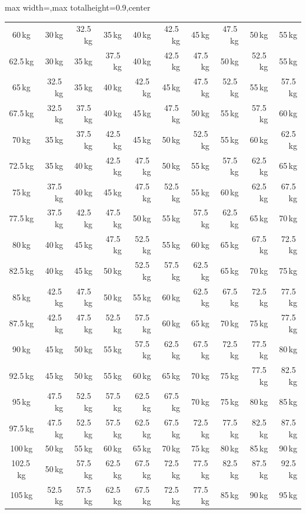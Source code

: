 \documentclass[11pt,a4paper]{article}
\begin{document}
\begin{center}
\begin{adjustbox}{max width=\linewidth,max totalheight=0.9\textheight,center}
\begin{tabular}{crrrrrrrrr}
60\,kg    & 30\,kg & 32.5\,kg & 35\,kg & 40\,kg & 42.5\,kg & 45\,kg & 47.5\,kg & 50\,kg & 55\,kg \\
62.5\,kg  & 30\,kg & 35\,kg & 37.5\,kg & 40\,kg & 42.5\,kg & 47.5\,kg & 50\,kg & 52.5\,kg & 55\,kg \\
65\,kg    & 32.5\,kg & 35\,kg & 40\,kg & 42.5\,kg & 45\,kg & 47.5\,kg & 52.5\,kg & 55\,kg & 57.5\,kg \\
67.5\,kg  & 32.5\,kg & 37.5\,kg & 40\,kg & 45\,kg & 47.5\,kg & 50\,kg & 55\,kg & 57.5\,kg & 60\,kg \\
70\,kg    & 35\,kg & 37.5\,kg & 42.5\,kg & 45\,kg & 50\,kg & 52.5\,kg & 55\,kg & 60\,kg & 62.5\,kg \\
72.5\,kg  & 35\,kg & 40\,kg & 42.5\,kg & 47.5\,kg & 50\,kg & 55\,kg & 57.5\,kg & 62.5\,kg & 65\,kg \\
75\,kg    & 37.5\,kg & 40\,kg & 45\,kg & 47.5\,kg & 52.5\,kg & 55\,kg & 60\,kg & 62.5\,kg & 67.5\,kg \\
77.5\,kg  & 37.5\,kg & 42.5\,kg & 47.5\,kg & 50\,kg & 55\,kg & 57.5\,kg & 62.5\,kg & 65\,kg & 70\,kg \\
80\,kg    & 40\,kg & 45\,kg & 47.5\,kg & 52.5\,kg & 55\,kg & 60\,kg & 65\,kg & 67.5\,kg & 72.5\,kg \\
82.5\,kg  & 40\,kg & 45\,kg & 50\,kg & 52.5\,kg & 57.5\,kg & 62.5\,kg & 65\,kg & 70\,kg & 75\,kg \\
85\,kg    & 42.5\,kg & 47.5\,kg & 50\,kg & 55\,kg & 60\,kg & 62.5\,kg & 67.5\,kg & 72.5\,kg & 77.5\,kg \\
87.5\,kg  & 42.5\,kg & 47.5\,kg & 52.5\,kg & 57.5\,kg & 60\,kg & 65\,kg & 70\,kg & 75\,kg & 77.5\,kg \\
90\,kg    & 45\,kg & 50\,kg & 55\,kg & 57.5\,kg & 62.5\,kg & 67.5\,kg & 72.5\,kg & 77.5\,kg & 80\,kg \\
92.5\,kg  & 45\,kg & 50\,kg & 55\,kg & 60\,kg & 65\,kg & 70\,kg & 75\,kg & 77.5\,kg & 82.5\,kg \\
95\,kg    & 47.5\,kg & 52.5\,kg & 57.5\,kg & 62.5\,kg & 67.5\,kg & 70\,kg & 75\,kg & 80\,kg & 85\,kg \\
97.5\,kg  & 47.5\,kg & 52.5\,kg & 57.5\,kg & 62.5\,kg & 67.5\,kg & 72.5\,kg & 77.5\,kg & 82.5\,kg & 87.5\,kg \\
100\,kg   & 50\,kg & 55\,kg & 60\,kg & 65\,kg & 70\,kg & 75\,kg & 80\,kg & 85\,kg & 90\,kg \\
102.5\,kg & 50\,kg & 57.5\,kg & 62.5\,kg & 67.5\,kg & 72.5\,kg & 77.5\,kg & 82.5\,kg & 87.5\,kg & 92.5\,kg \\
105\,kg   & 52.5\,kg & 57.5\,kg & 62.5\,kg & 67.5\,kg & 72.5\,kg & 77.5\,kg & 85\,kg & 90\,kg & 95\,kg \\
\bottomrule
\end{tabular}
\end{adjustbox}
\renewcommand{\arraystretch}{1}
\end{center}
\end{document}
